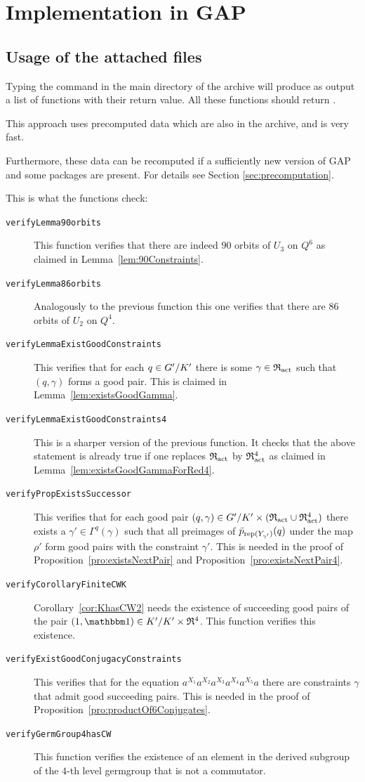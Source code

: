 \documentclass[a4paper,11pt]{amsart}
\begin{document}
\section{Implementation in GAP}
\subsection{Usage of the attached files} \label{sec:gap_verify} Typing
the command  in the main directory of the
archive will produce as output a list of functions with their return
value. All these functions should return .

This approach uses precomputed data which are also in the
archive, and is very fast.

Furthermore, these data can be recomputed if a sufficiently new
version of GAP and some packages are present. For details see Section
\ref{sec:precomputation}.

This is what the functions check:
\begin{description}
\item[\texttt{verifyLemma90orbits}] This function verifies that there
  are indeed $90$ orbits of $U_3$ on $Q^6$ as claimed in
  Lemma~\ref{lem:90Constraints}.
\item[\texttt{verifyLemma86orbits}] Analogously to the previous function 
  this one verifies that there are $86$ orbits of $U_2$ on $Q^4$. 
\item[\texttt{verifyLemmaExistGoodConstraints}] This verifies that for each 
  $q\in{G'/K'}$ there is some $\gamma\in\mathfrak{R}_{\operatorname{act}}$ such that $(q,\gamma)$ 
  forms a good pair. This is claimed in Lemma~\ref{lem:existsGoodGamma}.
\item[\texttt{verifyLemmaExistGoodConstraints4}] This is a sharper version
  of the previous function. It checks that the above statement is already true 
  if one replaces $\mathfrak{R}_{\operatorname{act}}$ by $\mathfrak{R}_{\operatorname{act}}^4$ as claimed in 
  Lemma~\ref{lem:existsGoodGammaForRed4}.
\item[\texttt{verifyPropExistsSuccessor}] This verifies that for
  each good pair $(q,\gamma) \in{G'/K'}\times(\mathfrak{R}_{\operatorname{act}}\cup \mathfrak{R}_{\operatorname{act}}^4)$ there exists 
  a $\gamma'\in\Gamma^q(\gamma)$ such that all preimages of 
  $\bar p_{\operatorname{rep}(Y_{\gamma'})}(q)$ under the map $\rho'$ form
  good pairs with the constraint $\gamma'$. This is needed in the proof of
  Proposition~\ref{pro:existsNextPair} and Proposition~\ref{pro:existsNextPair4}.
\item[\texttt{verifyCorollaryFiniteCWK}] Corollary~\ref{cor:KhasCW2} needs the
  existence of succeeding good pairs of the pair $(1,\id)\in\RNK{K'}{K'}\times\Red^4$.
  This function verifies this existence. 
\item[\texttt{verifyExistGoodConjugacyConstraints}] This verifies that for the equation
  $a^{X_1}a^{X_2}a^{X_3}a^{X_4}a^{X_5}a$ there are constraints $\gamma$ 
  that admit good succeeding pairs. This is needed in the proof of
  Proposition~\ref{pro:productOf6Conjugates}.
\item[\texttt{verifyGermGroup4hasCW}] This function verifies the existence of 
  an element in the derived subgroup of the $4$-th level germgroup that is not a commutator.
\end{description}
\end{document}
